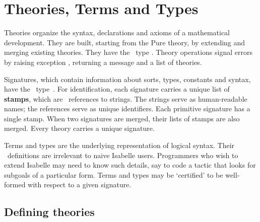 
\chapter{Theories, Terms and Types} \label{theories}
Theories organize the syntax, declarations and axioms of a mathematical
development.  They are built, starting from the Pure theory, by extending
and merging existing theories.  They have the \ML\ type .
Theory operations signal errors by raising exception ,
returning a message and a list of theories.

Signatures, which contain information about sorts, types, constants and
syntax, have the \ML\ type~.  For identification,
each signature carries a unique list of {\bf stamps}, which are \ML\
references to strings.  The strings serve as human-readable names; the
references serve as unique identifiers.  Each primitive signature has a
single stamp.  When two signatures are merged, their lists of stamps are
also merged.  Every theory carries a unique signature.

Terms and types are the underlying representation of logical syntax.  Their
\ML\ definitions are irrelevant to naive Isabelle users.  Programmers who
wish to extend Isabelle may need to know such details, say to code a tactic
that looks for subgoals of a particular form.  Terms and types may be
`certified' to be well-formed with respect to a given signature.


\section{Defining theories}\label{sec:ref-defining-theories}

